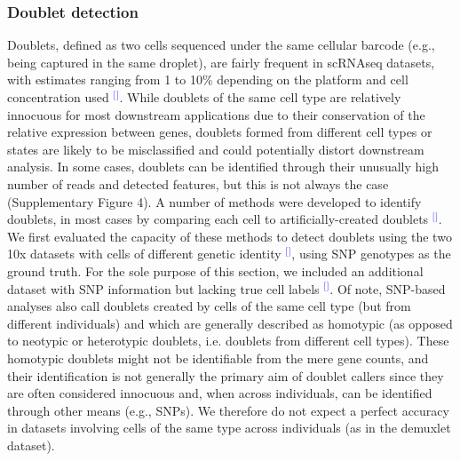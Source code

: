 \documentclass[11pt]{article}
\renewcommand{\cite}[1]{\textcolor{Blue}{$^[$\supercite{#1}$^]$}}
\begin{document}
\subsubsection*{Doublet detection}

Doublets, defined as two cells sequenced under the same cellular barcode (e.g., being captured in the same droplet), are fairly frequent in scRNAseq datasets, with estimates ranging from 1 to 10\% depending on the platform and cell concentration used \cite{bloomEstimating2018,kangMultiplexedDemuxlet2018}. While doublets of the same cell type are relatively innocuous for most downstream applications due to their conservation of the relative expression between genes, doublets formed from different cell types or states are likely to be misclassified and could potentially distort downstream analysis. In some cases, doublets can be identified through their unusually high number of reads and detected features, but this is not always the case (Supplementary Figure 4). A number of methods were developed to identify doublets, in most cases by comparing each cell to artificially-created doublets \cite{mcginnisDoubletfinder2019, LunScran2016, BaisScds2019}. We first evaluated the capacity of these methods to detect doublets using the two 10x datasets with cells of different genetic identity \cite{tianMixology2018}, using SNP genotypes as the ground truth. For the sole purpose of this section, we included an additional dataset with SNP information but lacking true cell labels \cite{kangMultiplexedDemuxlet2018}. Of note, SNP-based analyses also call doublets created by cells of the same cell type (but from different individuals) and which are generally described as homotypic (as opposed to neotypic or heterotypic doublets, i.e. doublets from different cell types). These homotypic doublets might not be identifiable from the mere gene counts, and their identification is not generally the primary aim of doublet callers since they are often considered innocuous and, when across individuals, can be identified through other means (e.g., SNPs). We therefore do not expect a perfect accuracy in datasets involving cells of the same type across individuals (as in the demuxlet dataset).
\end{document}
